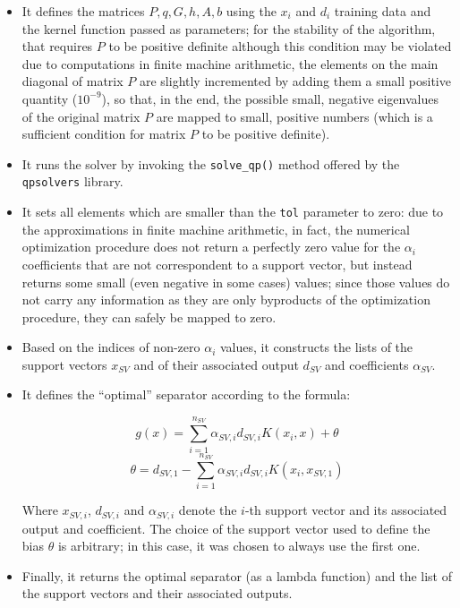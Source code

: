 \documentclass[letterpaper,headings=standardclasses]{scrartcl}
\begin{document}
\begin{itemize}
    \item It defines the matrices $P, q, G, h, A, b$ using the $x_i$ and $d_i$ training data and the kernel function passed as parameters; for the stability of the algorithm, that requires $P$ to be positive definite although this condition may be violated due to computations in finite machine arithmetic, the elements on the main diagonal of matrix $P$ are slightly incremented by adding them a small positive quantity ($10^{-9}$), so that, in the end, the possible small, negative eigenvalues of the original matrix $P$ are mapped to small, positive numbers (which is a sufficient condition for matrix $P$ to be positive definite).
    
    \item It runs the solver by invoking the \texttt{solve\_qp()} method offered by the \texttt{qpsolvers} library.
    
    \item It sets all elements which are smaller than the \texttt{tol} parameter to zero: due to the approximations in finite machine arithmetic, in fact, the numerical optimization procedure does not return a perfectly zero value for the $\alpha_i$ coefficients that are not correspondent to a support vector, but instead returns some small (even negative in some cases) values; since those values do not carry any information as they are only byproducts of the optimization procedure, they can safely be mapped to zero.
    
    \item Based on the indices of non-zero $\alpha_i$ values, it constructs the lists of the support vectors $x_{SV}$ and of their associated output $d_{SV}$ and coefficients $\alpha_{SV}$.
    
    \item It defines the ``optimal'' separator according to the formula:
    
    $$ g(x) = \sum_{i = 1}^{n_{SV}} \alpha_{SV,i} d_{SV,i} K(x_i, x) + \theta $$
    $$ \theta = d_{SV,1} - \sum_{i = 1}^{n_{SV}} \alpha_{SV,i} d_{SV,i} K(x_i, x_{SV,1}) $$

    Where $x_{SV,i}$, $d_{SV,i}$ and $\alpha_{SV,i}$ denote the $i$-th support vector and its associated output and coefficient. The choice of the support vector used to define the bias $\theta$ is arbitrary; in this case, it was chosen to always use the first one.

    \item Finally, it returns the optimal separator (as a lambda function) and the list of the support vectors and their associated outputs.
\end{itemize}
\end{document}
